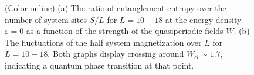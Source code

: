 \documentclass[prl,aps,epsf,showpacs,twocolumn,letterpaper]{revtex4}
\begin{document}
\begin{figure}
	\caption{
		(Color online) 
(a) The ratio of entanglement entropy over the number of system sites $S/L$ for $L=10-18$ at the energy density $\varepsilon=0$
 as a function of the  strength of the quasiperiodic fields $W$.  (b) 
The fluctuations of the half system magnetization over $L$ for $L=10-18$.
Both graphs display crossing around $W_{cl}\sim1.7$, indicating a quantum phase transition at that point.  
}
	\label{fig1}
\end{figure}
\end{document}
